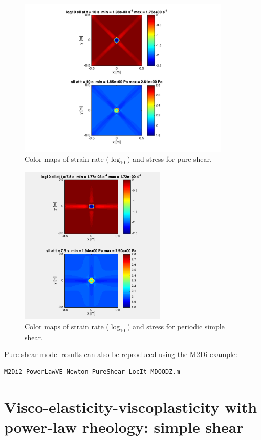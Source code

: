 \documentclass[12pt,english,openany]{scrbook}
\begin{document}
\begin{figure}[ht!]
\centerline{\includegraphics[height=3.0in]{./Figures/PureShear_pwl_VE_cmaps}}
\caption{Color maps of strain rate ($\log_{10}$) and stress for pure shear.}
\label{PureShear_pwl_VE_cmaps}
\end{figure}

\begin{figure}[ht!]
\centerline{\includegraphics[height=3.0in]{./Figures/SimpleShear_pwl_VE_cmaps}}
\caption{Color maps of strain rate ($\log_{10}$) and stress for periodic simple shear.}
\label{PureShear_pwl_VE_cmaps}
\end{figure}

Pure shear model results can also be reproduced using the M2Di example:
\begin{verbatim} 
M2Di2_PowerLawVE_Newton_PureShear_LocIt_MDOODZ.m
\end{verbatim}

\section{Visco-elasticity-viscoplasticity with power-law rheology: simple shear}
\end{document}
